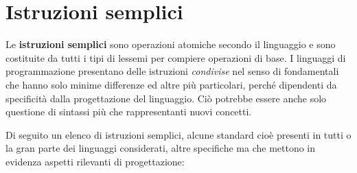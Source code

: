 \documentclass[
  letterpaper,
]{scrbook}
\begin{document}
\section{Istruzioni semplici}\label{istruzioni-semplici}

Le \textbf{istruzioni semplici} sono operazioni atomiche secondo il
linguaggio e sono costituite da tutti i tipi di lessemi per compiere
operazioni di base. I linguaggi di programmazione presentano delle
istruzioni \emph{condivise} nel senso di fondamentali che hanno solo
minime differenze ed altre più particolari, perché dipendenti da
specificità dalla progettazione del linguaggio. Ciò potrebbe essere
anche solo questione di sintassi più che rappresentanti nuovi concetti.

Di seguito un elenco di istruzioni semplici, alcune standard cioè
presenti in tutti o la gran parte dei linguaggi considerati, altre
specifiche ma che mettono in evidenza aspetti rilevanti di
progettazione:
\end{document}
